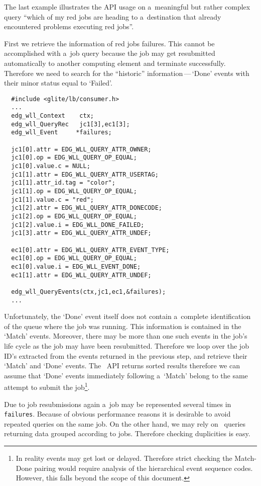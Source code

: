 The last example illustrates the API usage on
 a~meaningful but rather complex query ``which of my red jobs are heading  
to a~destination that already encountered problems executing red jobs''.

First we retrieve the information of red jobs failures.
This cannot be accomplished with a~job query because the job may
get resubmitted automatically to another computing element and terminate 
successfully. Therefore we need to search for the ``historic''
information\,---\,`Done' events with their minor status
equal to `Failed'.

\begin{verbatim}
  #include <glite/lb/consumer.h>
  ...
  edg_wll_Context    ctx;    
  edg_wll_QueryRec   jc1[3],ec1[3];
  edg_wll_Event     *failures;

  jc1[0].attr = EDG_WLL_QUERY_ATTR_OWNER;
  jc1[0].op = EDG_WLL_QUERY_OP_EQUAL;
  jc1[0].value.c = NULL;
  jc1[1].attr = EDG_WLL_QUERY_ATTR_USERTAG;
  jc1[1].attr_id.tag = "color";
  jc1[1].op = EDG_WLL_QUERY_OP_EQUAL;
  jc1[1].value.c = "red";
  jc1[2].attr = EDG_WLL_QUERY_ATTR_DONECODE;
  jc1[2].op = EDG_WLL_QUERY_OP_EQUAL;
  jc1[2].value.i = EDG_WLL_DONE_FAILED;
  jc1[3].attr = EDG_WLL_QUERY_ATTR_UNDEF;

  ec1[0].attr = EDG_WLL_QUERY_ATTR_EVENT_TYPE;
  ec1[0].op = EDG_WLL_QUERY_OP_EQUAL;
  ec1[0].value.i = EDG_WLL_EVENT_DONE;
  ec1[1].attr = EDG_WLL_QUERY_ATTR_UNDEF;

  edg_wll_QueryEvents(ctx,jc1,ec1,&failures);
  ...
\end{verbatim}

Unfortunately, the `Done' event itself does not contain a~complete
identification of the queue where the job was running.
This information is contained in the `Match' events.
Moreover, there may be more than one such events in the job's life cycle
as the job may have been resubmitted.
Therefore we loop over the job ID's extracted from the events returned
in the previous step, and retrieve their `Match' and `Done' events.
The \LB\ API returns sorted results therefore we can assume that `Done'
events immediately following a~`Match' belong to the same attempt to submit
the job\footnote{In reality events may get lost or delayed.
Therefore strict checking the Match-Done pairing would require analysis
of the hierarchical event sequence codes.
However, this falls beyond the scope of this document.}.

Due to job resubmissions again
a~job may be represented several times in \verb'failures'.
Because of obvious performance reasons 
it is desirable to avoid repeated queries on the same job.
On the other hand, we may rely on \LB\ queries returning data grouped
according to jobs. Therefore checking duplicities is easy.

